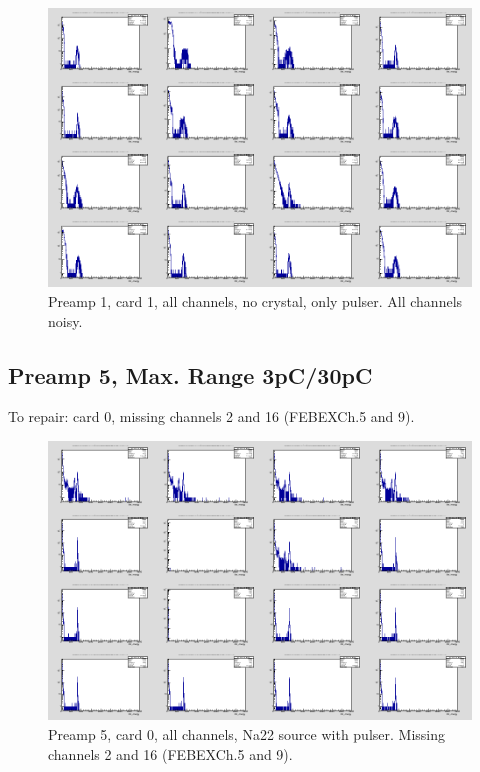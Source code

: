 \documentclass{report}
\begin{document}
\begin{figure}[!htb]
  \includegraphics[width=\linewidth]{preamp1_lim_energy_card1_all.png}
  \caption{Preamp 1, card 1, all channels, no crystal, only pulser. All channels noisy.}
\end{figure}
\newpage
\clearpage

\subsection{Preamp 5, Max. Range 3pC/30pC}
To repair: card 0, missing channels 2 and 16 (FEBEXCh.5 and 9).
\begin{figure}[!htb]
  \includegraphics[width=\linewidth]{preamp5_lim_energy_card0_all.png}
  \caption{Preamp 5, card 0, all channels, Na22 source  with pulser. Missing channels 2 and 16 (FEBEXCh.5 and 9).}
\end{figure}
\newpage
\clearpage
\end{document}
